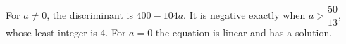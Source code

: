 For $a\ne0$, the discriminant is $400-104a$. It is negative exactly when $a > \dfrac{50}{13}$, whose least integer is $\boxed4$. For $a=0$ the equation is linear and has a solution.
